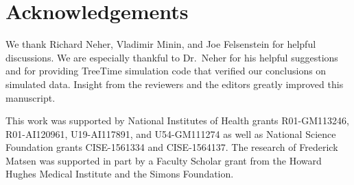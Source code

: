 \documentclass[11pt]{article}
\newcommand{\beginsupplement}{%
        \setcounter{table}{0}
        \renewcommand{\thetable}{S\arabic{table}}%
        \setcounter{figure}{0}
        \renewcommand{\thefigure}{S\arabic{figure}}%
     }
\begin{document}
\section*{Acknowledgements}
We thank Richard Neher, Vladimir Minin, and Joe Felsenstein for helpful discussions.
We are especially thankful to Dr.\ Neher for his helpful suggestions and for providing TreeTime simulation code that verified our conclusions on simulated data.
Insight from the reviewers and the editors greatly improved this manuscript.

This work was supported by National Institutes of Health grants R01-GM113246, R01-AI120961, U19-AI117891, and U54-GM111274 as well as National Science Foundation grants CISE-1561334 and CISE-1564137.
The research of Frederick Matsen was supported in part by a Faculty Scholar grant from the Howard Hughes Medical Institute and the Simons Foundation.




\newpage
\beginsupplement


\end{document}
